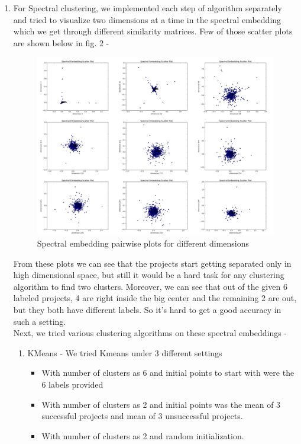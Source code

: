 \documentclass{article}
\begin{document}
\begin{enumerate}
\item For Spectral clustering, we implemented each step of algorithm separately and tried to visualize two dimensions at a time in the spectral embedding which we get through different similarity matrices. Few of those scatter plots are shown below in fig. 2 -
\begin{figure}[H]
\centering
\includegraphics[width=16cm]{joined.png}
\caption{Spectral embedding pairwise plots for different dimensions}
\label{Fig1: Spectral embedding pairwise plots for different dimensions}
\end{figure}
From these plots we can see that the projects start getting separated only in high dimensional space, but still it would be a hard task for any clustering algorithm to find two clusters. Moreover, we can see that out of the given 6 labeled projects, 4 are right inside the big center and the remaining 2 are out, but they both have different labels. So it’s hard to get a good accuracy in such a setting.\\

Next, we tried various clustering algorithms on these spectral embeddings -\\
\begin{enumerate}
\item KMeans - We tried Kmeans under 3 different settings
\begin{itemize}
\item With number of clusters as 6  and initial points to start with were the 6 labels provided
\item With number of clusters as 2 and initial points was the mean of 3 successful projects and mean of 3 unsuccessful projects.
\item With number of clusters as 2 and random initialization.
\end{itemize}


\end{enumerate}
\end{enumerate}
\end{document}
